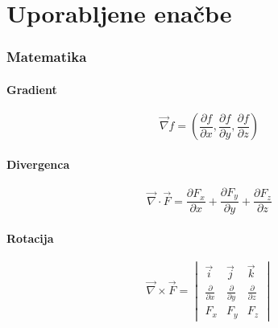 \documentclass[a4paper,12pt]{article}
\begin{document}
\newpage
\section{Uporabljene enačbe}
\subsubsection{Matematika}
\begin{multicols}{2}

    \paragraph{Gradient}
    \begin{equation}
        \label{eq:gradient}
        \vec{\nabla} f = \left( \frac{\partial f}{\partial x}, \frac{\partial f}{\partial y}, \frac{\partial f}{\partial z} \right)
    \end{equation}

    \paragraph{Divergenca}
    \begin{equation}
        \label{eq:divergenca}
        \vec{\nabla} \cdot \vec{F} = \frac{\partial F_x}{\partial x} + \frac{\partial F_y}{\partial y} + \frac{\partial F_z}{\partial z}
    \end{equation}

    \paragraph{Rotacija}
    \begin{equation}
        \label{eq:rotacija}
        \vec{\nabla} \times \vec{F} = \begin{vmatrix}
            \vec{i}                     & \vec{j}                     & \vec{k}                     \\
            \frac{\partial}{\partial x} & \frac{\partial}{\partial y} & \frac{\partial}{\partial z} \\
            F_x                         & F_y                         & F_z
        \end{vmatrix}
    \end{equation}

\end{multicols}
\end{document}
